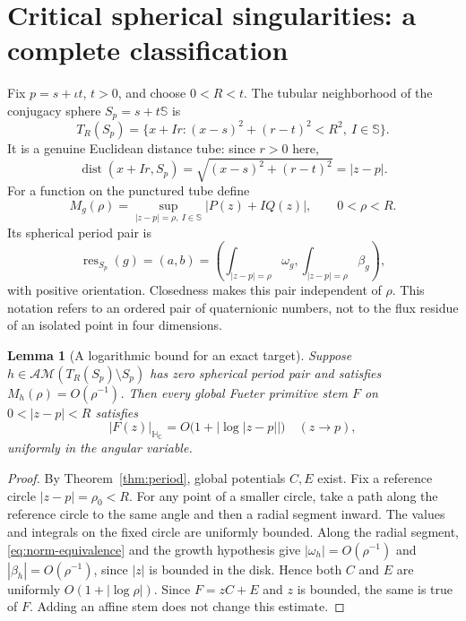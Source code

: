 \documentclass[11pt,a4paper]{article}
\numberwithin{equation}{section}
\newtheorem{lemma}[theorem]{Lemma}
\theoremstyle{definition}
\theoremstyle{remark}
\newcommand{\C}{\mathbb C}
\newcommand{\HC}{\mathbb H_{\C}}
\newcommand{\SSS}{\mathbb S}
\newcommand{\AM}{\mathcal{AM}}
\newcommand{\dist}{\operatorname{dist}}
\begin{document}
\section{Critical spherical singularities: a complete classification}
\label{sec:critical}
Fix $p=s+\iota t$, $t>0$, and choose $0<R<t$. The tubular neighborhood
of the conjugacy sphere $S_p=s+t\SSS$ is
\begin{equation}
 T_R(S_p)=\{x+Ir:(x-s)^2+(r-t)^2<R^2,\ I\in\SSS\}.
 \label{eq:tube}
\end{equation}
It is a genuine Euclidean distance tube: since $r>0$ here,
\begin{equation}
 \dist(x+Ir,S_p)=\sqrt{(x-s)^2+(r-t)^2}=|z-p|.
 \label{eq:distance-tube}
\end{equation}
For a function on the punctured tube define
\begin{equation}
 M_g(\rho)=\sup_{|z-p|=\rho,\ I\in\SSS}|P(z)+IQ(z)|,
 \qquad 0<\rho<R.\label{eq:M-growth}
\end{equation}
Its spherical period pair is
\begin{equation}
 \operatorname{res}_{S_p}(g)=(a,b)
 =\left(\int_{|z-p|=\rho}\omega_g,
        \int_{|z-p|=\rho}\beta_g\right),\label{eq:spherical-residue}
\end{equation}
with positive orientation. Closedness makes this pair independent of
$\rho$. This notation refers to an ordered pair of quaternionic numbers,
not to the flux residue of an isolated point in four dimensions.

\begin{lemma}[A logarithmic bound for an exact target]
\label{lem:log-bound}
Suppose $h\in\AM(T_R(S_p)\setminus S_p)$ has zero spherical period pair
and satisfies $M_h(\rho)=O(\rho^{-1})$. Then every global Fueter
primitive stem $F$ on $0<|z-p|<R$ satisfies
\begin{equation}
 |F(z)|_{\HC}=O\bigl(1+|\log|z-p||\bigr)\quad(z\to p),
 \label{eq:log-bound}
\end{equation}
uniformly in the angular variable.
\end{lemma}
\begin{proof}
By Theorem~\ref{thm:period}, global potentials $C,E$ exist.
Fix a reference circle $|z-p|=\rho_0<R$. For any point of a smaller
circle, take a path along the reference circle to the same angle and
then a radial segment inward. The values and integrals on the fixed
circle are uniformly bounded. Along the radial segment,
\eqref{eq:norm-equivalence} and the growth hypothesis give
$|\omega_h|=O(\rho^{-1})$ and $|\beta_h|=O(\rho^{-1})$, since
$|z|$ is bounded in the disk. Hence both $C$ and $E$ are uniformly
$O(1+|\log\rho|)$. Since $F=zC+E$ and $z$ is bounded, the same is true
of $F$. Adding an affine stem does not change this estimate.
\end{proof}
\end{document}
